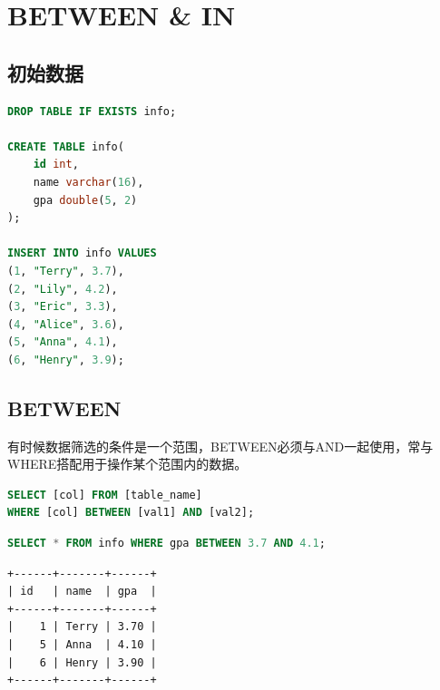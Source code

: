 \documentclass[12pt, openany, oneside]{book}
\begin{document}
\newpage

\chapter{BETWEEN \& IN}

\section{初始数据}


\begin{lstlisting}[language=SQL]
DROP TABLE IF EXISTS info;

CREATE TABLE info(
    id int,
    name varchar(16),
    gpa double(5, 2)
);

INSERT INTO info VALUES
(1, "Terry", 3.7),
(2, "Lily", 4.2),
(3, "Eric", 3.3),
(4, "Alice", 3.6),
(5, "Anna", 4.1),
(6, "Henry", 3.9);
\end{lstlisting}

\vspace{0.5cm}

\section{BETWEEN}

有时候数据筛选的条件是一个范围，BETWEEN必须与AND一起使用，常与WHERE搭配用于操作某个范围内的数据。

\vspace{-0.5cm}

\begin{lstlisting}[language=SQL]
SELECT [col] FROM [table_name]
WHERE [col] BETWEEN [val1] AND [val2];
\end{lstlisting}

\vspace{0.5cm}


\begin{lstlisting}[language=SQL]
SELECT * FROM info WHERE gpa BETWEEN 3.7 AND 4.1;
\end{lstlisting}

\begin{tcolorbox}
\begin{verbatim}
+------+-------+------+
| id   | name  | gpa  |
+------+-------+------+
|    1 | Terry | 3.70 |
|    5 | Anna  | 4.10 |
|    6 | Henry | 3.90 |
+------+-------+------+
\end{verbatim}
\end{tcolorbox}
\end{document}
